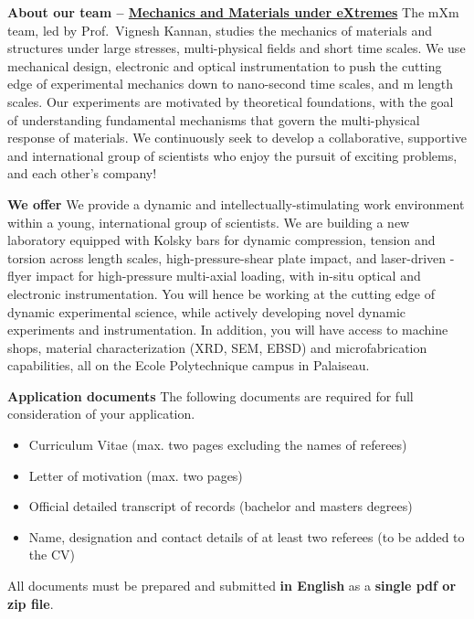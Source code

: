 \documentclass[a4paper,11pt,fleqn]{article}
\begin{document}
	\vspace*{-3em}
	\begin{myhlbox}{\textbf{About our team -- \href{https://vigneshkannan-group.github.io/vk-mxm-website/}{Mechanics and Materials under eXtremes}}}
		The mXm team, led by Prof.~Vignesh Kannan, studies the mechanics of materials and structures under large stresses, multi-physical fields and short time scales. We use mechanical design, electronic and optical instrumentation to push the cutting edge of experimental mechanics down to nano-second time scales, and \textmu m length scales. Our experiments are motivated by theoretical foundations, with the goal of understanding fundamental mechanisms that govern the multi-physical response of materials. We continuously seek to develop a collaborative, supportive and international group of scientists who enjoy the pursuit of exciting problems, and each other's company!
	\end{myhlbox}

	\begin{myhlbox}{\textbf{We offer}}
		We provide a dynamic and intellectually-stimulating work environment within a young, international group of scientists. We are building a new laboratory equipped with Kolsky bars for dynamic compression, tension and torsion across length scales, high-pressure-shear plate impact, and laser-driven \textmu-flyer impact for high-pressure multi-axial loading, with in-situ optical and electronic instrumentation. You will hence be working at the cutting edge of dynamic experimental science, while actively developing novel dynamic experiments and instrumentation. In addition, you will have access to machine shops, material characterization (XRD, SEM, EBSD) and microfabrication capabilities, all on the Ecole Polytechnique campus in Palaiseau. 
	\end{myhlbox}

	\begin{myhlbox}{\textbf{Application documents}}
		The following documents are required for full consideration of your application. 
		\begin{itemize}[leftmargin=*, itemsep=-0.25em]
			\item Curriculum Vitae (max. two pages excluding the names of referees)
			\item Letter of motivation (max. two pages)
			\item Official detailed transcript of records (bachelor and masters degrees)
			\item Name, designation and contact details of at least two referees (to be added to the CV)
		\end{itemize}
		\vspace{0em}
		All documents must be prepared and submitted \textbf{in English} as a \textbf{single pdf or zip file}. 
	\end{myhlbox}
\end{document}
